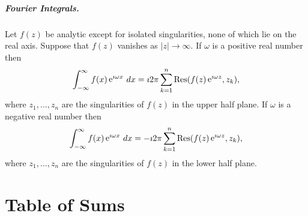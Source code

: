 \paragraph{Fourier Integrals.}
Let $f(z)$ be analytic except for isolated singularities, none
of which lie on the real axis.  Suppose that $f(z)$ vanishes as 
$|z| \to \infty$.  If $\omega$ is a positive real number then
\[
\int_{-\infty}^\infty f(x) \mathop{\mathrm{e}}\nolimits^{\imath \omega x} \,d x
= \imath 2 \pi \sum_{k = 1}^n \mathop{\mathrm{Res}}\nolimits( f(z) \mathop{\mathrm{e}}\nolimits^{\imath \omega z}, z_k ),
\]
where $z_1, \ldots, z_n$ are the singularities of $f(z)$ in the upper
half plane.
If $\omega$ is a negative real number then
\[
\int_{-\infty}^\infty f(x) \mathop{\mathrm{e}}\nolimits^{\imath \omega x} \,d x
= - \imath 2 \pi \sum_{k = 1}^n \mathop{\mathrm{Res}}\nolimits( f(z) \mathop{\mathrm{e}}\nolimits^{\imath \omega z}, z_k ),
\]
where $z_1, \ldots, z_n$ are the singularities of $f(z)$ in the lower
half plane.










\raggedbottom
\chapter{Table of Sums}
\raggedbottom 






